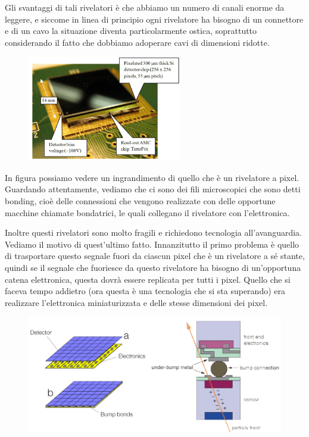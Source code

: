Gli svantaggi di tali rivelatori è che abbiamo un numero di canali enorme da leggere, e siccome in linea di principio ogni rivelatore ha bisogno di un connettore e di un cavo la situazione diventa particolarmente ostica, soprattutto considerando il fatto che dobbiamo adoperare cavi di dimensioni ridotte.
\begin{figure}[H]
   \centering
   \includegraphics[width=0.6\textwidth]{immagini/zoom_rivelatore_silicio.png}
\end{figure}
In figura possiamo vedere un ingrandimento di quello che è un rivelatore a pixel. Guardando attentamente, vediamo che ci sono dei fili microscopici che sono detti bonding, cioè delle connessioni che vengono realizzate con delle opportune macchine chiamate bondatrici, le quali collegano il rivelatore con l'elettronica.

Inoltre questi rivelatori sono molto fragili e richiedono tecnologia all'avanguardia. Vediamo il motivo di quest'ultimo fatto. Innanzitutto il primo problema è quello di trasportare questo segnale fuori da ciascun pixel che è un rivelatore a sé stante, quindi se il segnale che fuoriesce da questo rivelatore ha bisogno di un'opportuna catena elettronica, questa dovrà essere replicata per tutti i pixel. Quello che si faceva tempo addietro (ora questa è una tecnologia che si sta superando) era realizzare l'elettronica miniaturizzata e delle stesse dimensioni dei pixel.

\begin{figure}[H]
   \centering
   \includegraphics[width=\textwidth]{immagini/connessione_rivelatore_a_pixel.png}
\end{figure}

